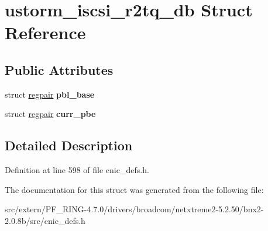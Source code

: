 \hypertarget{structustorm__iscsi__r2tq__db}{
\section{ustorm\_\-iscsi\_\-r2tq\_\-db Struct Reference}
\label{structustorm__iscsi__r2tq__db}
}
\subsection*{Public Attributes}
\begin{DoxyCompactItemize}
\item 
\hypertarget{structustorm__iscsi__r2tq__db_a00b17b4baf80f1fe7e8bbdfc547dda60}{
struct \hyperlink{structregpair}{regpair} {\bfseries pbl\_\-base}}
\label{structustorm__iscsi__r2tq__db_a00b17b4baf80f1fe7e8bbdfc547dda60}

\item 
\hypertarget{structustorm__iscsi__r2tq__db_a072e67dce8eb2ba3ea595aab239b7a82}{
struct \hyperlink{structregpair}{regpair} {\bfseries curr\_\-pbe}}
\label{structustorm__iscsi__r2tq__db_a072e67dce8eb2ba3ea595aab239b7a82}

\end{DoxyCompactItemize}


\subsection{Detailed Description}


Definition at line 598 of file cnic\_\-defs.h.



The documentation for this struct was generated from the following file:\begin{DoxyCompactItemize}
\item 
src/extern/PF\_\-RING-\/4.7.0/drivers/broadcom/netxtreme2-\/5.2.50/bnx2-\/2.0.8b/src/cnic\_\-defs.h\end{DoxyCompactItemize}
